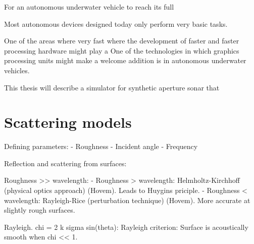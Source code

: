 For an autonomous underwater vehicle to reach its full 

Most autonomous devices designed today only perform very basic tasks.

One of the areas where very fast where the development of faster and faster processing hardware might play a
One of the technologies in which graphics processing units might make a welcome addition is in autonomous underwater vehicles. 

This thesis will describe a simulator for synthetic aperture sonar that 

\section{Scattering models}


Defining parameters:
- Roughness
- Incident angle
- Frequency


Reflection and scattering from surfaces:

Roughness >> wavelength:
- Roughness > wavelength: Helmholtz-Kirchhoff (physical optics approach) (Hovem). Leads to Huygins priciple.
- Roughness < wavelength: Rayleigh-Rice (perturbation technique) (Hovem). More accurate at slightly rough surfaces.

Rayleigh. chi = 2 k sigma sin(theta): Rayleigh criterion: Surface is acoustically smooth when chi << 1.

